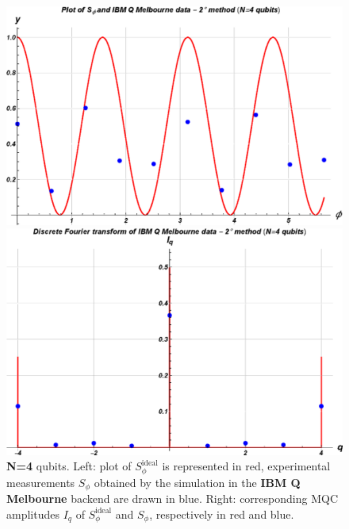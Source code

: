 \begin{figure}[h!]
\begin{minipage}[c]{0.5\linewidth}
\hspace{1cm}
\centering \includegraphics[width=1\textwidth]{./chapter3/graphics_IBM/real_device/S4_ibmqmelbourne.eps}
\end{minipage}
\begin{minipage}[]{0.5\linewidth}
\centering \includegraphics[width=1\textwidth]{./chapter3/graphics_IBM/real_device/I4_ibmqmelbourne.eps}
\end{minipage}
\caption{\label{RealDeviceIBMQMELBOURNE4} \textbf{N=4} qubits. Left:  plot of $S_{\phi}^{\text{ideal}}$ is represented in red, experimental measurements $S_{\phi}$ obtained by the simulation in the \textbf{IBM Q Melbourne} backend are drawn in blue. Right: corresponding MQC amplitudes $I_q$ of $S_\phi^{\text{ideal}}$ and $S_\phi$, respectively in red and blue.}
\end{figure}


